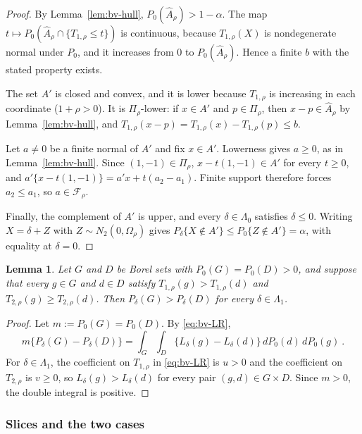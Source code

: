\documentclass[11pt]{article}
\numberwithin{equation}{section}
\newtheorem{lemma}{Lemma}
\theoremstyle{definition}
\begin{document}
\begin{proof}
By Lemma~\ref{lem:bv-hull}, $P_0(\widehat A_\rho)>1-\alpha$. The map $t\mapsto P_0(\widehat A_\rho\cap\{T_{1,\rho}\le t\})$ is continuous, because $T_{1,\rho}(X)$ is nondegenerate normal under $P_0$, and it increases from $0$ to $P_0(\widehat A_\rho)$. Hence a finite $b$ with the stated property exists.

The set $A'$ is closed and convex, and it is lower because $T_{1,\rho}$ is increasing in each coordinate ($1+\rho>0$). It is $\Pi_\rho$-lower: if $x\in A'$ and $p\in\Pi_\rho$, then $x-p\in\widehat A_\rho$ by Lemma~\ref{lem:bv-hull}, and $T_{1,\rho}(x-p)=T_{1,\rho}(x)-T_{1,\rho}(p)\le b$.

Let $a\ne0$ be a finite normal of $A'$ and fix $x\in A'$. Lowerness gives $a\ge0$, as in Lemma~\ref{lem:bv-hull}. Since $(1,-1)\in\Pi_\rho$, $x-t(1,-1)\in A'$ for every $t\ge0$, and $a'\{x-t(1,-1)\}=a'x+t(a_2-a_1)$. Finite support therefore forces $a_2\le a_1$, so $a\in\mathcal F_\rho$.

Finally, the complement of $A'$ is upper, and every $\delta\in\Lambda_0$ satisfies $\delta\le0$. Writing $X=\delta+Z$ with $Z\sim N_2(0,\Omega_\rho)$ gives $P_\delta\{X\notin A'\}\le P_0\{Z\notin A'\}=\alpha$, with equality at $\delta=0$.
\end{proof}

\begin{lemma}\label{lem:bv-transfer}
Let $G$ and $D$ be Borel sets with $P_0(G)=P_0(D)>0$, and suppose that every $g\in G$ and $d\in D$ satisfy $T_{1,\rho}(g)>T_{1,\rho}(d)$ and $T_{2,\rho}(g)\ge T_{2,\rho}(d)$. Then $P_\delta(G)>P_\delta(D)$ for every $\delta\in\Lambda_1$.
\end{lemma}

\begin{proof}
Let $m:=P_0(G)=P_0(D)$. By \eqref{eq:bv-LR},
\[
m\{P_\delta(G)-P_\delta(D)\}=\int_G\int_D\{L_\delta(g)-L_\delta(d)\}\,dP_0(d)\,dP_0(g)~.
\]
For $\delta\in\Lambda_1$, the coefficient on $T_{1,\rho}$ in \eqref{eq:bv-LR} is $u>0$ and the coefficient on $T_{2,\rho}$ is $v\ge0$, so $L_\delta(g)>L_\delta(d)$ for every pair $(g,d)\in G\times D$. Since $m>0$, the double integral is positive.
\end{proof}

\subsubsection*{Slices and the two cases}
\end{document}
